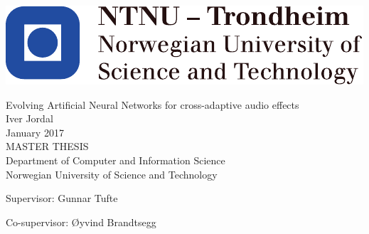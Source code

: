 
\thispagestyle{empty}
\includegraphics[scale=1.1]{fig/ntnu}
\mbox{}\\[6pc]
\begin{center}
\Huge{Evolving Artificial Neural Networks for cross-adaptive audio effects}\\[2pc]

\Large{Iver Jordal}\\[1pc]
\large{January 2017}\\[2pc]

MASTER THESIS\\
Department of Computer and Information Science\\
Norwegian University of Science and Technology
\end{center}
\vfill

\noindent Supervisor: Gunnar Tufte

\noindent Co-supervisor: Øyvind Brandtsegg

